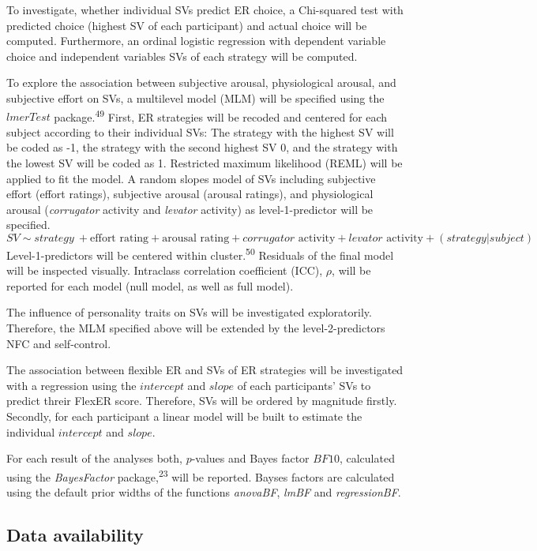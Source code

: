 \documentclass[
  english,
  man,floatsintext]{apa6}
\begin{document}
To investigate, whether individual SVs predict ER choice, a Chi-squared test with predicted choice (highest SV of each participant) and actual choice will be computed.
Furthermore, an ordinal logistic regression with dependent variable choice and independent variables SVs of each strategy will be computed.

To explore the association between subjective arousal, physiological arousal, and subjective effort on SVs, a multilevel model (MLM) will be specified using the \(lmerTest\) package.\textsuperscript{49}
First, ER strategies will be recoded and centered for each subject according to their individual SVs: The strategy with the highest SV will be coded as -1, the strategy with the second highest SV 0, and the strategy with the lowest SV will be coded as 1.
Restricted maximum likelihood (REML) will be applied to fit the model.
A random slopes model of SVs including subjective effort (effort ratings), subjective arousal (arousal ratings), and physiological arousal (\emph{corrugator} activity and \emph{levator} activity) as level-1-predictor will be specified.
\[
SV \sim strategy\ + \text{effort rating} + \text{arousal rating} + corrugator \text{ activity} + levator \text{ activity} + (strategy|subject)
\] Level-1-predictors will be centered within cluster.\textsuperscript{50}
Residuals of the final model will be inspected visually.
Intraclass correlation coefficient (ICC), \(\rho\), will be reported for each model (null model, as well as full model).

The influence of personality traits on SVs will be investigated exploratorily.
Therefore, the MLM specified above will be extended by the level-2-predictors NFC and self-control.

The association between flexible ER and SVs of ER strategies will be investigated with a regression using the \(intercept\) and \(slope\) of each participants' SVs to predict threir FlexER score.
Therefore, SVs will be ordered by magnitude firstly.
Secondly, for each participant a linear model will be built to estimate the individual \(intercept\) and \(slope\).

For each result of the analyses both, \(p\)-values and Bayes factor \(BF10\), calculated using the \emph{BayesFactor} package,\textsuperscript{23} will be reported. Bayses factors are calculated using the default prior widths of the functions \emph{anovaBF}, \emph{lmBF} and \emph{regressionBF}.

\hypertarget{data-availability}{%
\subsection{Data availability}\label{data-availability}}
\end{document}

